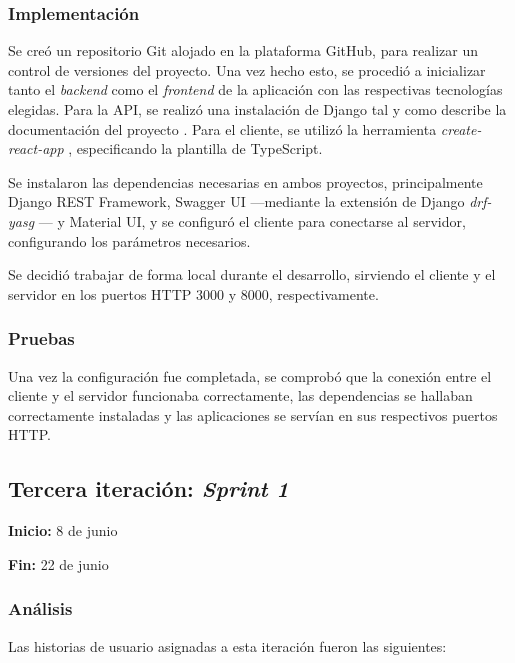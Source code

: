 \documentclass[10pt, a4paper]{aqademic}
\begin{document}
\clearpage

\subsubsection{Implementación}

Se creó un repositorio Git alojado en la plataforma GitHub, para realizar un control de versiones del proyecto. Una vez hecho esto, se procedió a inicializar tanto el \textit{backend} como el \textit{frontend} de la aplicación con las respectivas tecnologías elegidas. Para la API, se realizó una instalación de Django tal y como describe la documentación del proyecto \cite{noauthor_how_nodate}. Para el cliente, se utilizó la herramienta \textit{create-react-app} \cite{noauthor_create_nodate}, especificando la plantilla de TypeScript.

Se instalaron las dependencias necesarias en ambos proyectos, principalmente Django REST Framework, Swagger UI ---mediante la extensión de Django \textit{drf-yasg} \cite{vijdea_drf-yasg_nodate}--- y Material UI, y se configuró el cliente para conectarse al servidor, configurando los parámetros necesarios.

Se decidió trabajar de forma local durante el desarrollo, sirviendo el cliente y el servidor en los puertos HTTP 3000 y 8000, respectivamente.

\subsubsection{Pruebas}

Una vez la configuración fue completada, se comprobó que la conexión entre el cliente y el servidor funcionaba correctamente, las dependencias se hallaban correctamente instaladas y las aplicaciones se servían en sus respectivos puertos HTTP.


\subsection{Tercera iteración: \textit{Sprint 1}}

\textbf{Inicio:} 8 de junio

\textbf{Fin:} 22 de junio


\subsubsection{Análisis}

Las historias de usuario asignadas a esta iteración fueron las siguientes:
\end{document}
